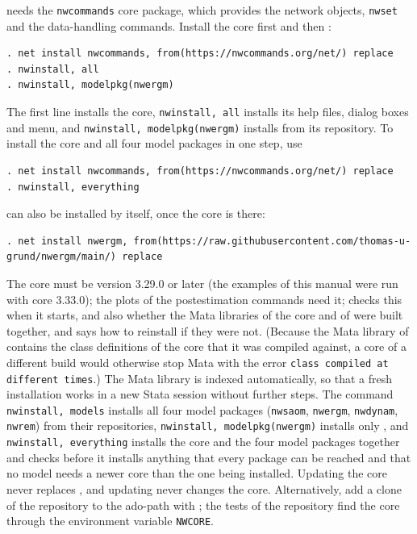 \nwergm{} needs the \texttt{nwcommands} core package, which provides the network objects, \texttt{nwset} and the data-handling commands. Install the core first and then \nwergm{}:
\begin{lstlisting}
. net install nwcommands, from(https://nwcommands.org/net/) replace
. nwinstall, all
. nwinstall, modelpkg(nwergm)
\end{lstlisting}
The first line installs the core, \texttt{nwinstall, all} installs its help files, dialog boxes and menu, and \texttt{nwinstall, modelpkg(nwergm)} installs \nwergm{} from its repository. To install the core and all four model packages in one step, use
\begin{lstlisting}
. net install nwcommands, from(https://nwcommands.org/net/) replace
. nwinstall, everything
\end{lstlisting}
\nwergm{} can also be installed by itself, once the core is there:
\begin{lstlisting}
. net install nwergm, from(https://raw.githubusercontent.com/thomas-u-grund/nwergm/main/) replace
\end{lstlisting}
The core must be version 3.29.0 or later (the examples of this manual were run with core 3.33.0); the plots of the postestimation commands need it; \nwergm{} checks this when it starts, and also whether the Mata libraries of the core and of \nwergm{} were built together, and says how to reinstall if they were not. (Because the Mata library of \nwergm{} contains the class definitions of the core that it was compiled against, a core of a different build would otherwise stop Mata with the error \texttt{class compiled at different times}.) The Mata library is indexed automatically, so that a fresh installation works in a new Stata session without further steps. The command \texttt{nwinstall, models} installs all four model packages (\texttt{nwsaom}, \texttt{nwergm}, \texttt{nwdynam}, \texttt{nwrem}) from their repositories, \texttt{nwinstall, modelpkg(nwergm)} installs only \nwergm{}, and \texttt{nwinstall, everything} installs the core and the four model packages together and checks before it installs anything that every package can be reached and that no model needs a newer core than the one being installed. Updating the core never replaces \nwergm{}, and updating \nwergm{} never changes the core. Alternatively, add a clone of the \nwergm{} repository to the ado-path with ; the tests of the repository find the core through the environment variable \texttt{NWCORE}.

